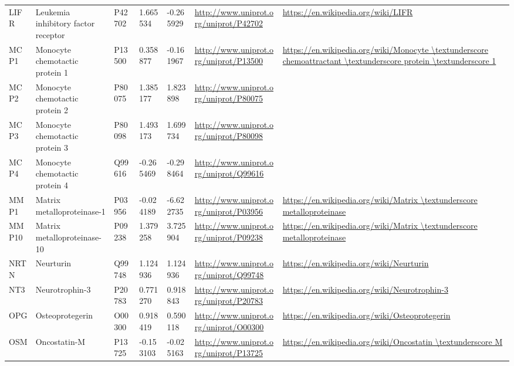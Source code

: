 \begin{table}[H]
\begin{tabular}{ lllllll }
        \multicolumn{1}{l|}{ LIFR } &  Leukemia inhibitory factor receptor   & P42702   & 1.665534   & -0.265929   & \url{http://www.uniprot.org/uniprot/P42702}   & \url{https://en.wikipedia.org/wiki/LIFR}          \\ 
        \multicolumn{1}{l|}{ MCP1 } &  Monocyte chemotactic protein 1   & P13500   & 0.358877   & -0.161967   & \url{http://www.uniprot.org/uniprot/P13500}   & \url{https://en.wikipedia.org/wiki/Monocyte \textunderscore chemoattractant \textunderscore protein \textunderscore 1}          \\ 
        \multicolumn{1}{l|}{ MCP2 } &  Monocyte chemotactic protein 2   & P80075   & 1.385177   & 1.823898   & \url{http://www.uniprot.org/uniprot/P80075}   &           \\ 
        \multicolumn{1}{l|}{ MCP3 } &  Monocyte chemotactic protein 3   & P80098   & 1.493173   & 1.699734   & \url{http://www.uniprot.org/uniprot/P80098}   &           \\ 
        \multicolumn{1}{l|}{ MCP4 } &  Monocyte chemotactic protein 4   & Q99616   & -0.265469   & -0.298464   & \url{http://www.uniprot.org/uniprot/Q99616}   &           \\ 
        \multicolumn{1}{l|}{ MMP1 } &  Matrix metalloproteinase-1   & P03956   & -0.024189   & -6.622735   & \url{http://www.uniprot.org/uniprot/P03956}   & \url{https://en.wikipedia.org/wiki/Matrix \textunderscore metalloproteinase}          \\ 
        \multicolumn{1}{l|}{ MMP10 } &  Matrix metalloproteinase-10   & P09238   & 1.379258   & 3.725904   & \url{http://www.uniprot.org/uniprot/P09238}   & \url{https://en.wikipedia.org/wiki/Matrix \textunderscore metalloproteinase}          \\ 
        \multicolumn{1}{l|}{ NRTN } &  Neurturin   & Q99748   & 1.124936   & 1.124936   & \url{http://www.uniprot.org/uniprot/Q99748}   & \url{https://en.wikipedia.org/wiki/Neurturin}          \\ 
        \multicolumn{1}{l|}{ NT3 } &  Neurotrophin-3   & P20783   & 0.771270   & 0.918843   & \url{http://www.uniprot.org/uniprot/P20783}   & \url{https://en.wikipedia.org/wiki/Neurotrophin-3}          \\ 
        \multicolumn{1}{l|}{ OPG } &  Osteoprotegerin   & O00300   & 0.918419   & 0.590118   & \url{http://www.uniprot.org/uniprot/O00300}   & \url{https://en.wikipedia.org/wiki/Osteoprotegerin}          \\ 
        \multicolumn{1}{l|}{ OSM } &  Oncostatin-M   & P13725   & -0.153103   & -0.025163   & \url{http://www.uniprot.org/uniprot/P13725}   & \url{https://en.wikipedia.org/wiki/Oncostatin \textunderscore M}          \\ 

\end{tabular}
\end{table}
